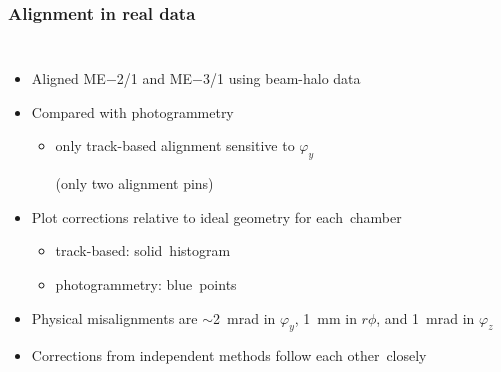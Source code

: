 \documentclass[compress]{beamer}
\begin{document}
\begin{frame}
\frametitle{Alignment in real data}

\vfill
\begin{columns}
\begin{itemize}
\item Aligned ME$-$2/1 and ME$-$3/1 using beam-halo data
\item Compared with \mbox{photogrammetry\hspace{-1 cm}}
\begin{itemize}
\item only track-based alignment sensitive to $\varphi_y$

(only two alignment pins)
\end{itemize}
\item Plot corrections relative to ideal geometry for \mbox{each chamber\hspace{-1 cm}}
\begin{itemize}
\item track-based: \mbox{solid histogram\hspace{-1 cm}}
\item photogrammetry: \mbox{blue points\hspace{-1 cm}}
\end{itemize}
\item Physical misalignments are $\sim$2~mrad in $\varphi_y$, 1~mm in $r\phi$, and 1~mrad in $\varphi_z$
\item Corrections from independent methods follow each \mbox{other closely\hspace{-1 cm}}
\end{itemize}


\end{columns}
\end{frame}
\end{document}
